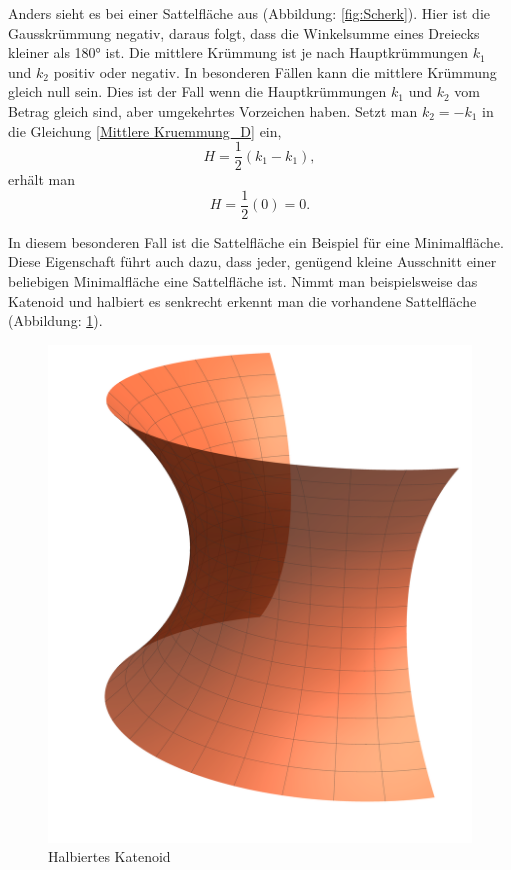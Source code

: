 \begin{refsection}
Anders sieht es bei einer Sattelfläche aus (Abbildung: \ref{fig:Scherk}). Hier ist die Gausskrümmung negativ, daraus folgt, dass die Winkelsumme eines Dreiecks kleiner als 180° ist. Die mittlere Krümmung ist je nach Hauptkrümmungen $k_1$ und $k_2$ positiv oder negativ. In besonderen Fällen kann die mittlere Krümmung gleich null sein. Dies ist der Fall wenn die Hauptkrümmungen $k_1$ und $k_2$ vom Betrag gleich sind, aber umgekehrtes Vorzeichen haben. Setzt man $k_2 = - k_1$ in die Gleichung \ref{Mittlere Kruemmung_D} ein,
\begin{equation}
H=\frac{1}{2}(k_1-k_1),
\end{equation}
erhält man 
\begin{equation}
H=\frac{1}{2}(0)=0.
\end{equation}

In diesem besonderen Fall ist die Sattelfläche ein Beispiel für eine Minimalfläche. Diese Eigenschaft führt auch dazu, dass jeder, genügend kleine Ausschnitt einer beliebigen Minimalfläche eine Sattelfläche ist. Nimmt man beispielsweise das Katenoid und halbiert es senkrecht erkennt man die vorhandene Sattelfläche (Abbildung: \ref{fig:CatenoidHalf}). 

\begin{figure}
  \centering
  \includegraphics[scale=0.1]{minimal/CatenoidHalf.pdf}
  \caption{Halbiertes Katenoid} 
  \label{fig:CatenoidHalf}
\end{figure}


\end{refsection}
